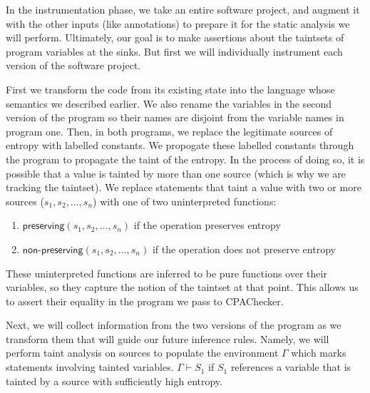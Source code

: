 \documentclass[letterpaper,twocolumn,10pt]{article}
\begin{document}
	In the instrumentation phase, we take an entire software project, and augment it with the other inputs (like annotations) to prepare it for the static analysis we will perform. Ultimately, our goal is to make assertions about the taintsets of program variables at the sinks. But first we will individually instrument each version of the software project.

	First we transform the code from its existing state into the language whose semantics we described earlier. We also rename the variables in the second version of the program so their names are disjoint from the variable names in program one. Then, in both programs, we replace the legitimate sources of entropy with labelled constants. We propogate these labelled constants through the program to propagate the taint of the entropy. In the process of doing so, it is possible that a value is tainted by more than one source (which is why we are tracking the taintset). We replace statements that taint a value with two or more sources ($s_1, s_2, \ldots, s_n$) with one of two uninterpreted functions: 

	\begin{enumerate}
		\item $\textsf{preserving}(s_1, s_2, \ldots, s_n)$ if the operation preserves entropy 
		\item $\textsf{non-preserving}(s_1, s_2, \ldots, s_n)$ if the operation does not preserve entropy 
	\end{enumerate}

	These uninterpreted functions are inferred to be pure functions over their variables, so they capture the notion of the taintset at that point. This allows us to assert their equality in the program we pass to CPAChecker. 

	Next, we will collect information from the two versions of the program as we transform them that will guide our future inference rules. Namely, we will perform taint analysis on sources to populate the environment $\Gamma$ which marks statements involving tainted variables. $\Gamma \vdash S_1$ if $S_1$ references a variable that is tainted by a source with sufficiently high entropy.  

\end{document}
